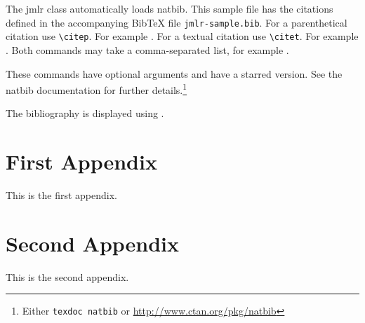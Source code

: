 \documentclass[pmlr]{jmlr}
\begin{document}
The \textsf{jmlr} class automatically loads \textsf{natbib}.
This sample file has the citations defined in the accompanying
BibTeX file \texttt{jmlr-sample.bib}. For a parenthetical
citation use \verb|\citep|. For example
\citep{guyon-elisseeff-03}. For a textual citation use
\verb|\citet|. For example \citet{guyon2007causalreport}.
Both commands may take a comma-separated list, for example
\citet{guyon-elisseeff-03,guyon2007causalreport}.

These commands have optional arguments and have a starred
version. See the \textsf{natbib} documentation for further
details.\footnote{Either \texttt{texdoc natbib} or
\url{http://www.ctan.org/pkg/natbib}}

The bibliography is displayed using \verb||.




\appendix

\section{First Appendix}\label{apd:first}

This is the first appendix.

\section{Second Appendix}\label{apd:second}

This is the second appendix.
\end{document}
